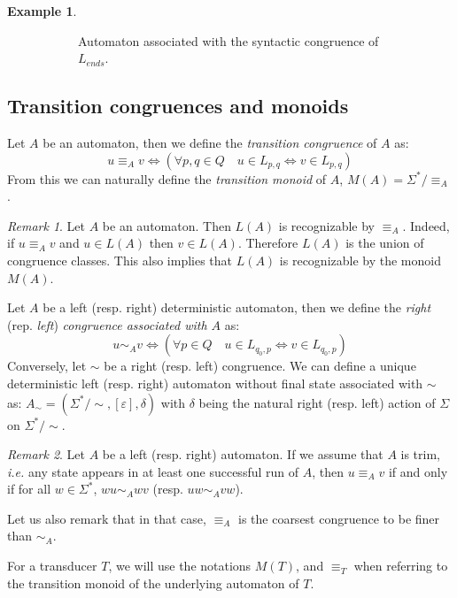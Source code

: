 \documentclass[12pt]{report}
\theoremstyle{definition}
\newtheorem{xmp}{Example}[section]
\theoremstyle{remark}
\newtheorem{rmk}{Remark}[section]
\begin{document}
\begin{xmp}
\begin{figure}[t]
\begin{subfigure}[b]{0.4\textwidth}
\caption{Automaton associated with the syntactic congruence of $L_{ends}$.}
        \end{subfigure}
        \caption{}
        \label{mon1}
\end{figure}

\end{xmp}

\subsection{Transition congruences and monoids}
Let $A$ be an automaton, then we define the \emph{transition congruence} of $A$ as:
$$u\equiv_A v \Leftrightarrow \left( \forall p,q\in Q \quad u\in L_{p,q} \Leftrightarrow v\in L_{p,q} \right)$$
From this we can naturally define the \emph{transition monoid} of $A$,  $M(A)=\Sigma^\ast/\equiv_A$.

\begin{rmk}
Let $A$ be an automaton. Then $L(A)$ is recognizable by $\equiv_A$.
Indeed, if $u\equiv_A v$ and $u \in L(A)$ then $v\in L(A)$.
Therefore $L(A)$ is the union of congruence classes.
This also implies that $L(A)$ is recognizable by the monoid $M(A)$.
\end{rmk}

Let $A$ be a left (resp. right) deterministic automaton, then we define the \emph{right} (rep. \emph{left}) \emph{congruence associated with $A$} as:
$$u\sim_A v \Leftrightarrow \left( \forall p\in Q \quad u\in L_{q_0,p} \Leftrightarrow v\in L_{q_0,p} \right)$$
Conversely, let $\sim$ be a right (resp. left) congruence.
We can define a unique deterministic left (resp. right) automaton without final state associated with $\sim$ as:
$A_\sim=(\Sigma^\ast/\sim,[\varepsilon],\delta)$ with $\delta$ being the natural right (resp. left) action of $\Sigma$ on $\Sigma^\ast/\sim$.

\begin{rmk}
\label{rmk1}
Let $A$ be a left (resp. right) automaton. If we assume that $A$ is trim, \emph{i.e.} any state appears in at least one successful run of $A$, then $u\equiv_A v$ if and only if for all $w\in \Sigma^\ast$, $wu\sim_A wv$ (resp. $uw\sim_A vw$).

Let us also remark that in that case, $\equiv_A$ is the coarsest congruence to be finer than $\sim_A$.
\end{rmk}
For a transducer $T$, we will use the notations $M(T)$, and $\equiv_T$ when referring to the transition monoid of the underlying automaton of $T$.
\end{document}
